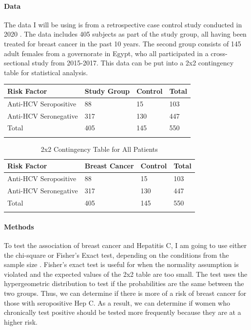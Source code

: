 \documentclass[12pt, titlepage]{article}
\begin{document}
\paragraph{Data}
\label{sec:data}
The data I will be using is from a retrospective case control study conducted in 2020 \citep{2020association}. The data includes 405 subjects as
part of the study group, all having been treated for breast cancer in the past 10 years. The second group consists of 145 adult females
from a governorate in Egypt, who all participated in a cross-sectional study from 2015-2017. This data can be put into a 2x2 contingency table
for statistical analysis. 

\vspace{1cm}

\begin{tabular}{ | m{5cm} | m{3cm}| m{3cm} | m{2cm} | }
  \hline
  Risk Factor & Study Group & Control & Total\\ 
  \hline
  Anti-HCV Seropositive & 88 & 15 & 103 \\ 
  \hline
  Anti-HCV Seronegative & 317 & 130 & 447 \\ 
  \hline
  Total & 405 & 145 & 550 \\ 
  \hline
  \label{table:total}
\end{tabular}

\begin{longtable}[]{@{}lll@{}}
\toprule
Risk Factor & Breast Cancer & Control & Total\tabularnewline
\midrule
\endhead
Anti-HCV Seropositive & 88 & 15 & 103\tabularnewline
Anti-HCV Seronegative & 317 & 130 & 447\tabularnewline
Total & 405 & 145 & 550\tabularnewline
\bottomrule
\caption{2x2 Contingency Table for All Patients}
\label{table:total}
\end{longtable}


\paragraph{Methods}
\label{sec:methods}
To test the association of breast cancer and Hepatitis C, I am going to use either the chi-square or Fisher's Exact test, depending on the
conditions from the sample size \citep{warner2013testing}. Fisher's exact test is useful for when the normality assumption is violated 
and the expected values of the 2x2 table are too small. The test uses the hypergeometric distribution to test if the probabilities are
the same between the two groups. Thus, we can determine if there is more of a risk of breast cancer for those with seropositive Hep C. As
 a result, we can determine if women who chronically test positive should be tested more frequently because they are at a higher risk. 
 
\end{document}
